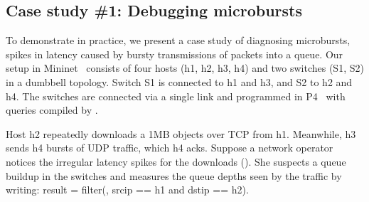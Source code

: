 \subsection{Case study \#1: Debugging microbursts}
\label{s:eval:mininet}
\label{sec:eval:mininet}

To demonstrate \TheSystem in practice, we present a case study of
diagnosing microbursts, \ie spikes in latency caused by bursty
transmissions of packets into a queue.
Our setup in Mininet~\cite{mininet} consists of four hosts
({\ct h1, h2, h3, h4}) and two switches ({\ct S1, S2}) in a dumbbell topology.
Switch {\ct S1} is connected to {\ct h1} and {\ct h3},
and {\ct S2} to {\ct h2} and {\ct h4}.
The switches are connected via a single link and
programmed in P4~\cite{p4-bmv2} with queries compiled by \TheSystem.

Host {\ct h2} repeatedly downloads a 1MB objects over TCP from {\ct h1}.
Meanwhile, {\ct h3} sends {\ct h4} bursts of UDP traffic, which
{\ct h4} acks.  Suppose a network operator notices the irregular latency
spikes for the downloads (). She suspects a queue buildup
in the switches and measures the queue depths seen by the traffic by writing:
{\ct result = filter(\pktlog, srcip == h1 and dstip == h2).}


